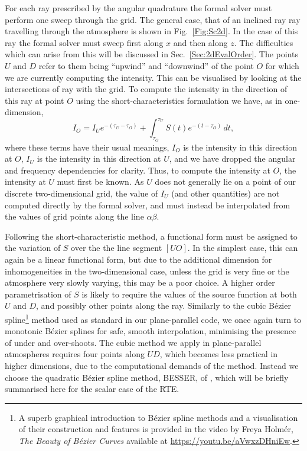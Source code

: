 For each ray prescribed by the angular quadrature the formal solver must perform one sweep through the grid.
The general case, that of an inclined ray ray travelling through the atmosphere is shown in Fig.~\ref{Fig:Sc2d}.
In the case of this ray the formal solver must sweep first along $x$ and then along $z$.
The difficulties which can arise from this will be discussed in Sec.~\ref{Sec:2dEvalOrder}.
The points $U$ and $D$ refer to them being ``upwind'' and ``downwind'' of the point $O$ for which we are currently computing the intensity.
This can be visualised by looking at the intersections of ray with the grid.
To compute the intensity in the direction of this ray at point $O$ using the short-characteristics formulation we have, as in one-dimension,
\begin{equation}\label{Eq:MiniScDefinition}
   I_O = I_U e^{-(\tau_U - \tau_O)} + \int_{\tau_O}^{\tau_U} S(t) e^{-(t - \tau_O)}\, dt,
\end{equation}
where these terms have their usual meanings, $I_O$ is the intensity in this direction at $O$, $I_U$ is the intensity in this direction at $U$, and we have dropped the angular and frequency dependencies for clarity.
Thus, to compute the intensity at $O$, the intensity at $U$ must first be known.
As $U$ does not generally lie on a point of our discrete two-dimensional grid, the value of $I_U$ (and other quantities) are not computed directly by the formal solver, and must instead be interpolated from the values of grid points along the line $\alpha\beta$.

Following the short-characteristic method, a functional form must be assigned to the variation of $S$ over the the line segment $[UO]$.
In the simplest case, this can again be a linear functional form, but due to the additional dimension for inhomogeneities in the two-dimensional case, unless the grid is very fine or the atmosphere very slowly varying, this may be a poor choice.
A higher order parametrisation of $S$ is likely to require the values of the source function at both $U$ and $D$, and possibly other points along the ray.
Similarly to the cubic Bézier spline\footnote{A superb graphical introduction to Bézier spline methods and a visualisation of their construction and features is provided in the video by Freya Holmér, \emph{The Beauty of Bézier Curves} available at \url{https://youtu.be/aVwxzDHniEw}.} method used as standard in our plane-parallel code, we once again turn to monotonic Bézier splines for safe, smooth interpolation, minimising the presence of under and over-shoots.
The cubic method we apply in plane-parallel atmospheres requires four points along $UD$, which becomes less practical in higher dimensions, due to the computational demands of the method.
Instead we choose the quadratic Bézier spline method, BESSER, of \citet{Stepan2013}, which will be briefly summarised here for the scalar case of the RTE.


